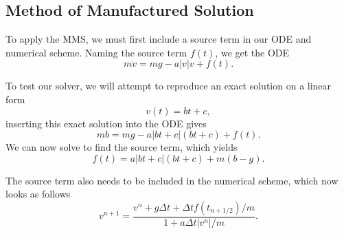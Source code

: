 \documentclass[a4paper, 11pt, notitlepage, english]{article}
\begin{document}
\subsection*{Method of Manufactured Solution}
To apply the MMS, we must first include a source term in our ODE and numerical scheme. Naming the source term $f(t)$, we get the ODE
$$m\dot{v} = mg - a |v| v + f(t).$$

To test our solver, we will attempt to reproduce an exact solution on a linear form
$$v(t) = bt + c,$$
inserting this exact solution into the ODE gives
$$mb = mg - a |bt + c| (bt + c) + f(t).$$
We can now solve to find the source term, which yields
$$f(t) = a |bt + c| (bt + c) + m(b-g).$$

The source term also needs to be included in the numerical scheme, which now looks as follows
$$v^{n+1} = \frac{v^n + g \Delta t + \Delta t f(t_{n+1/2})/m}{1 + a  \Delta t |v^n|/m}.$$
\end{document}
